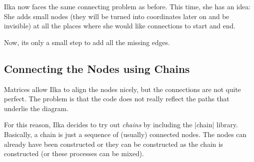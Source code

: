 Ilka now faces the same connecting problem as before. This time, she
has an idea: She adds small nodes (they will be turned into
coordinates later on and be invisible) at all the places
where she would like connections to start and end.
\begin{codeexample}[]
\end{codeexample}
Now, its only a small step to add all the missing edges.



\subsection{Connecting the Nodes using Chains}

Matrices allow Ilka to align the nodes nicely, but the connections are
not quite perfect. The problem is that the code does not really
reflect the paths that underlie the diagram.

For this reason, Ilka decides to try out \emph{chains} by including
the |chain| library. Basically, a chain is just a sequence of
(usually) connected nodes. The nodes can already have been constructed
or they can be constructed as the chain is constructed (or these
processes can be mixed).

